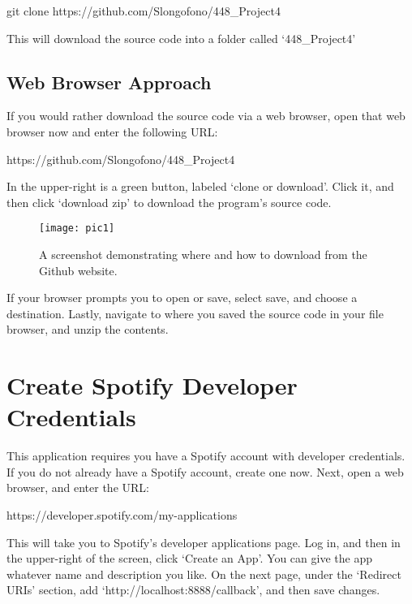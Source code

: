 \documentclass{roffin}
\begin{document}
\hspace{1cm} git clone https://github.com/Slongofono/448\_Project4

\hfill
\newline
This will download the source code into a folder called `448\_Project4' 

\subsection{Web Browser Approach}
If you would rather download the source code via a web browser, open that web browser now and enter the following URL: 
\newline

\hspace{1cm} https://github.com/Slongofono/448\_Project4

\hfill
\newline
In the upper-right is a green button, labeled `clone or download'. Click it, and then click `download zip' to download the program’s source code.

\begin{figure}[!h]
    \centering
    \texttt{[image: pic1]}
    \caption{A screenshot demonstrating where and how to download from the Github website.}
    \label{fig:fig1}
\end{figure}

If your browser prompts you to open or save, select save, and choose a destination. Lastly, navigate to where you saved the source code in your file browser, and unzip the contents.

\section{Create Spotify Developer Credentials}

This application requires you have a Spotify account with developer credentials. If you do not already have a Spotify account, create one now. Next, open a web browser, and enter the URL:  
\newline

\hspace{1cm} https://developer.spotify.com/my-applications

\hfill
\newline
This will take you to Spotify's developer applications page. Log in, and then in the upper-right of the screen, click `Create an App'. You can give the app whatever name and description you like. On the next page, under the `Redirect URIs' section, add `http://localhost:8888/callback', and then save changes.
\end{document}
